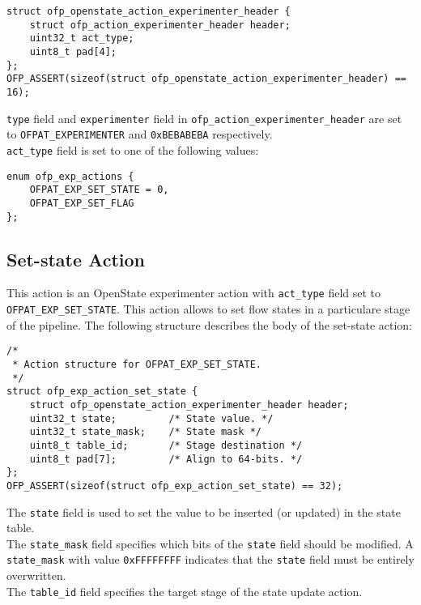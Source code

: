 \scriptsize\begin{verbatim}
struct ofp_openstate_action_experimenter_header {
    struct ofp_action_experimenter_header header;
    uint32_t act_type;
    uint8_t pad[4];
};
OFP_ASSERT(sizeof(struct ofp_openstate_action_experimenter_header) == 16);
\end{verbatim}\normalsize
\texttt{type} field and \texttt{experimenter} field in \texttt{ofp\_action\_experimenter\_header} are set to \texttt{OFPAT\_EXPERIMENTER} and \texttt{0xBEBABEBA} respectively.
\\
\texttt{act\_type} field is set to one of the following values:

\scriptsize\begin{verbatim}
enum ofp_exp_actions {
    OFPAT_EXP_SET_STATE = 0,
    OFPAT_EXP_SET_FLAG
};
\end{verbatim}\normalsize

\subsection{Set-state Action}
\label{sec:act_set_state_proto}

This action is an OpenState experimenter action with \texttt{act\_type} field set to \texttt{OFPAT\_EXP\_SET\_STATE}. This action allows to set flow states in a particulare stage of the pipeline. The following structure describes the body of the set-state action:

\scriptsize\begin{verbatim}
/*
 * Action structure for OFPAT_EXP_SET_STATE.
 */
struct ofp_exp_action_set_state {
    struct ofp_openstate_action_experimenter_header header;
    uint32_t state;         /* State value. */
    uint32_t state_mask;    /* State mask */
    uint8_t table_id;       /* Stage destination */
    uint8_t pad[7];         /* Align to 64-bits. */
};
OFP_ASSERT(sizeof(struct ofp_exp_action_set_state) == 32);
\end{verbatim}\normalsize
The \texttt{state} field is used to set the value to be inserted (or updated) in the state table.
\\
The \texttt{state\_mask} field specifies which bits of the \texttt{state} field should be modified. A \texttt{state\_mask} with value \texttt{0xFFFFFFFF} indicates that the \texttt{state} field must be entirely overwritten.
\\
The \texttt{table\_id} field specifies the target stage of the state update action.

